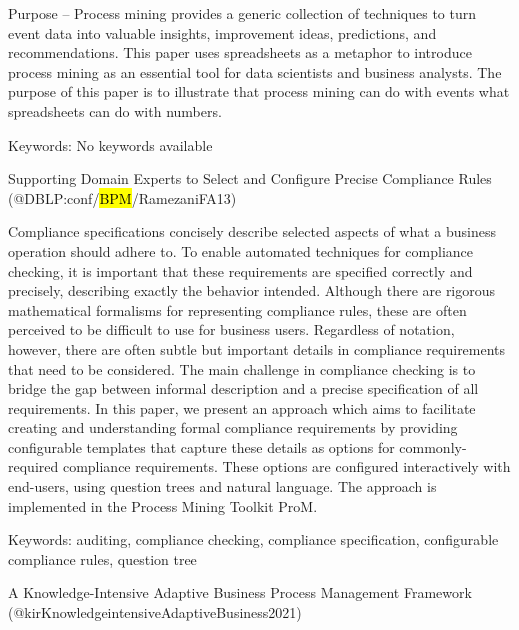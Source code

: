 \documentclass[
  letterpaper,
  DIV=11,
  numbers=noendperiod]{scrartcl}
\begin{document}
Purpose -- Process mining provides a generic collection of techniques to
turn event data into valuable insights, improvement ideas, predictions,
and recommendations. This paper uses spreadsheets as a metaphor to
introduce process mining as an essential tool for data scientists and
business analysts. The purpose of this paper is to illustrate that
process mining can do with events what spreadsheets can do with numbers.

Keywords: No keywords available

Supporting Domain Experts to Select and Configure Precise Compliance
Rules (@DBLP:conf/\hl{BPM}/RamezaniFA13)

Compliance specifications concisely describe selected aspects of what a
business operation should adhere to. To enable automated techniques for
compliance checking, it is important that these requirements are
specified correctly and precisely, describing exactly the behavior
intended. Although there are rigorous mathematical formalisms for
representing compliance rules, these are often perceived to be difficult
to use for business users. Regardless of notation, however, there are
often subtle but important details in compliance requirements that need
to be considered. The main challenge in compliance checking is to bridge
the gap between informal description and a precise specification of all
requirements. In this paper, we present an approach which aims to
facilitate creating and understanding formal compliance requirements by
providing configurable templates that capture these details as options
for commonly-required compliance requirements. These options are
configured interactively with end-users, using question trees and
natural language. The approach is implemented in the Process Mining
Toolkit ProM.

Keywords: auditing, compliance checking, compliance specification,
configurable compliance rules, question tree

A Knowledge-Intensive Adaptive Business Process Management Framework
(@kirKnowledgeintensiveAdaptiveBusiness2021)
\end{document}
